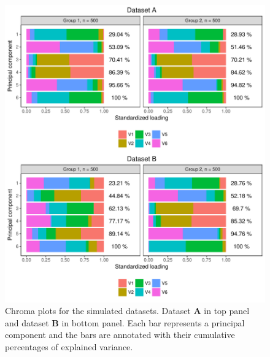 \documentclass[a4paper,12pt]{article}
\begin{document}
\begin{figure}[H]
\center
\includegraphics[scale=0.8]{Figure4_v3.pdf}
\caption{Chroma plots for the simulated datasets. Dataset $\mathbf{A}$ in top panel and dataset $\mathbf{B}$ in bottom panel. Each bar represents a principal component and the bars are annotated with their cumulative percentages of explained variance.}
\label{plot.simChroma}
\end{figure}
\end{document}
